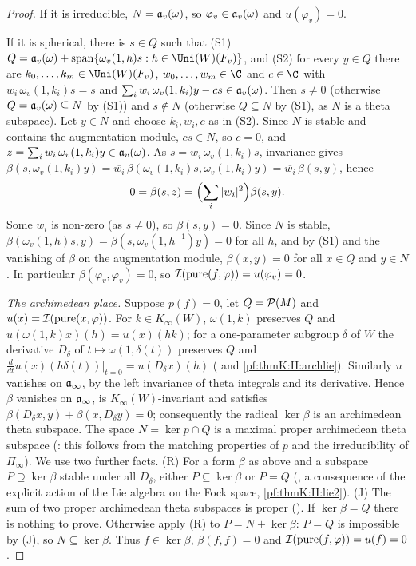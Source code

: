 \begin{proof}
If it is irreducible, $N=\mathfrak{a}_v(\omega)$, so $\varphi_v\in\mathfrak{a}_v(\omega)$ and $u(\varphi_v)=0$.

If it is spherical, there is $s\in Q$ such that (S1) $Q=\thmKaug_v(\omega)+\operatorname{span}\{\omega_v(1,h)s:h\in
\Uni(W)(F_v)\}$, and (S2) for every $y\in Q$ there are $k_0,\dots,k_m\in\Uni(W)(F_v)$, $w_0,\dots,w_m\in\C$ and $c\in\C$
with $w_i\,\omega_v(1,k_i)s=s$ and $\sum_iw_i\,\omega_v(1,k_i)y-cs\in\mathfrak{a}_v(\omega)$. Then $s\ne0$ (otherwise
$Q=\mathfrak{a}_v(\omega)\subseteq N$ by (S1)) and $s\notin N$ (otherwise $Q\subseteq N$ by (S1), as $N$ is a theta
subspace). Let $y\in N$ and choose $k_i,w_i,c$ as in (S2). Since $N$ is stable and contains the augmentation module,
$cs\in N$, so $c=0$, and $z=\sum_iw_i\,\omega_v(1,k_i)y\in\mathfrak{a}_v(\omega)$. As $s=w_i\,\omega_v(1,k_i)s$, invariance
gives $\beta(s,\omega_v(1,k_i)y)=\overline{w_i}\,\beta(\omega_v(1,k_i)s,\omega_v(1,k_i)y)=\overline{w_i}\,\beta(s,y)$, hence
\[
0=\beta(s,z)=\Bigl(\sum_i|w_i|^2\Bigr)\beta(s,y).
\]
Some $w_i$ is non-zero (as $s\ne0$), so $\beta(s,y)=0$. Since $N$ is stable, $\beta(\omega_v(1,h)s,y)=\beta(s,
\omega_v(1,h^{-1})y)=0$ for all $h$, and by (S1) and the vanishing of $\beta$ on the augmentation module, $\beta(x,y)=0$
for all $x\in Q$ and $y\in N$. In particular $\beta(\varphi_v,\varphi_v)=0$, so $\mathcal{I}(\operatorname{pure}(f,\varphi))=u(\varphi_v)
=0$.

\emph{The archimedean place.} Suppose $p(f)=0$, let $Q=\mathcal{P}(M)$ and $u(x)=\mathcal{I}(\operatorname{pure}(x,\varphi))$. For
$k\in K_\infty(W)$, $\omega(1,k)$ preserves $Q$ and $u(\omega(1,k)x)(h)=u(x)(hk)$; for a one-parameter subgroup $\delta$ of
$W$ the derivative $D_\delta$ of $t\mapsto\omega(1,\delta(t))$ preserves $Q$ and $\frac{d}{dt}u(x)(h\delta(t))|_{t=0}=
u(D_\delta x)(h)$ ( and \ref{pf:thmK:H:archlie}). Similarly $u$ vanishes on
$\mathfrak{a}_\infty$, by the left invariance of theta integrals and its derivative. Hence $\beta$ vanishes on
$\mathfrak{a}_\infty$, is $K_\infty(W)$-invariant and satisfies $\beta(D_\delta x,y)+\beta(x,D_\delta y)=0$; consequently the
radical $\ker\beta$ is an archimedean theta subspace. The space $N=\ker p\cap Q$ is a maximal proper archimedean theta
subspace (: this follows from the matching properties of $p$ and the irreducibility
of $\Pi_\infty$). We use two further facts. (R) For a form $\beta$ as above and a subspace $P\supseteq\ker\beta$ stable
under all $D_\delta$, either $P\subseteq\ker\beta$ or $P=Q$ (, a
consequence of the explicit action of the Lie algebra on the Fock space, \ref{pf:thmK:H:lie2}). (J) The sum of two proper
archimedean theta subspaces is proper (). If $\ker\beta=Q$ there is
nothing to prove. Otherwise apply (R) to $P=N+\ker\beta$: $P=Q$ is impossible by (J), so $N\subseteq\ker\beta$. Thus
$f\in\ker\beta$, $\beta(f,f)=0$ and $\mathcal{I}(\operatorname{pure}(f,\varphi))=u(f)=0$.


\end{proof}
